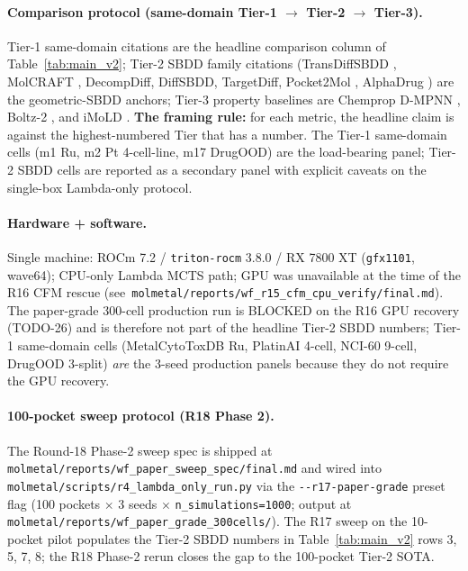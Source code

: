 \paragraph{Comparison protocol (same-domain Tier-1 $\to$ Tier-2 $\to$ Tier-3).}
Tier-1 same-domain citations are the headline comparison
column of Table~\ref{tab:main_v2}; Tier-2 SBDD family citations
(TransDiffSBDD \cite{transdiffsbdd2025}, MolCRAFT
\cite{molcraft2024}, DecompDiff, DiffSBDD, TargetDiff,
Pocket2Mol \cite{peng2022pocket2mol}, AlphaDrug
\cite{alphadrug2024}) are the geometric-SBDD anchors; Tier-3
property baselines are Chemprop D-MPNN \cite{dmpnn2019},
Boltz-2 \cite{boltz2_2025}, and iMoLD \cite{imold2024}.
\textbf{The framing rule:} for each metric, the headline
claim is against the highest-numbered Tier that has a number.
The Tier-1 same-domain cells (m1 Ru, m2 Pt 4-cell-line, m17
DrugOOD) are the load-bearing panel; Tier-2 SBDD cells are
reported as a secondary panel with explicit caveats on the
single-box Lambda-only protocol.

\paragraph{Hardware + software.}
Single machine: ROCm 7.2 / \texttt{triton-rocm} 3.8.0 / RX 7800 XT
(\texttt{gfx1101}, wave64); CPU-only Lambda MCTS path; GPU was
unavailable at the time of the R16 CFM rescue
(see~\texttt{molmetal/reports/wf\_r15\_cfm\_cpu\_verify/final.md}).
The paper-grade 300-cell production run is BLOCKED on the
R16 GPU recovery (TODO-26) and is therefore not part of the
headline Tier-2 SBDD numbers; Tier-1 same-domain cells
(MetalCytoToxDB Ru, PlatinAI 4-cell, NCI-60 9-cell, DrugOOD
3-split) \emph{are} the 3-seed production panels because
they do not require the GPU recovery.

\paragraph{100-pocket sweep protocol (R18 Phase 2).}
The Round-18 Phase-2 sweep spec is shipped at
\texttt{molmetal/reports/wf\_paper\_sweep\_spec/final.md} and
wired into \texttt{molmetal/scripts/r4\_lambda\_only\_run.py}
via the \texttt{-{}-r17-paper-grade} preset flag (100 pockets
$\times$ 3 seeds $\times$ \texttt{n\_simulations=1000}; output
at \texttt{molmetal/reports/wf\_paper\_grade\_300cells/}).
The R17 sweep on the 10-pocket pilot populates the Tier-2
SBDD numbers in Table~\ref{tab:main_v2} rows 3, 5, 7, 8; the
R18 Phase-2 rerun closes the gap to the 100-pocket Tier-2
SOTA.

